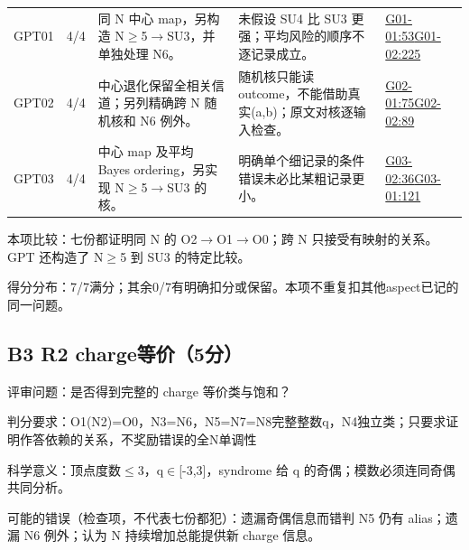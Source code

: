\documentclass[11pt,a4paper]{article}
\begin{document}
{\begin{longtable}
{}GPT01 & 4/4 & 同 N 中心 map，另构造 N\ensuremath{\geq}5\ensuremath{\rightarrow}SU3，并单独处理 N6。 & 未假设 SU4 比 SU3 更强；平均风险的顺序不逐记录成立。 & \hyperref[src:G01-01]{G01-01:53}\newline \hyperref[src:G01-02]{G01-02:225}\tabularnewline
{}GPT02 & 4/4 & 中心退化保留全相关信道；另列精确跨 N 随机核和 N6 例外。 & 随机核只能读 outcome，不能借助真实(a,b)；原文对核逐输入检查。 & \hyperref[src:G02-01]{G02-01:75}\newline \hyperref[src:G02-02]{G02-02:89}\tabularnewline
{}GPT03 & 4/4 & 中心 map 及平均 Bayes ordering，另实现 N\ensuremath{\geq}5\ensuremath{\rightarrow}SU3 的核。 & 明确单个细记录的条件错误未必比某粗记录更小。 & \hyperref[src:G03-02]{G03-02:36}\newline \hyperref[src:G03-01]{G03-01:121}\tabularnewline
\bottomrule
\end{longtable}
}
本项比较：七份都证明同 N 的 O2\ensuremath{\rightarrow}O1\ensuremath{\rightarrow}O0；跨 N 只接受有映射的关系。GPT 还构造了 N\ensuremath{\geq}5 到 SU3 的特定比较。

得分分布：7/7满分；其余0/7有明确扣分或保留。本项不重复扣其他aspect已记的同一问题。

\clearpage
\subsection{B3 R2 charge等价（5分）}
\label{aspect:B3}
评审问题：是否得到完整的 charge 等价类与饱和？

判分要求：O1(N2)=O0，N3=N6，N5=N7=N8完整整数q，N4独立类；只要求证明作答依赖的关系，不奖励错误的全N单调性

科学意义：顶点度数\ensuremath{\leq}3，q\ensuremath{\in}[-3,3]，syndrome 给 q 的奇偶；模数必须连同奇偶共同分析。

可能的错误（检查项，不代表七份都犯）：遗漏奇偶信息而错判 N5 仍有 alias；遗漏 N6 例外；认为 N 持续增加总能提供新 charge 信息。
\end{document}
